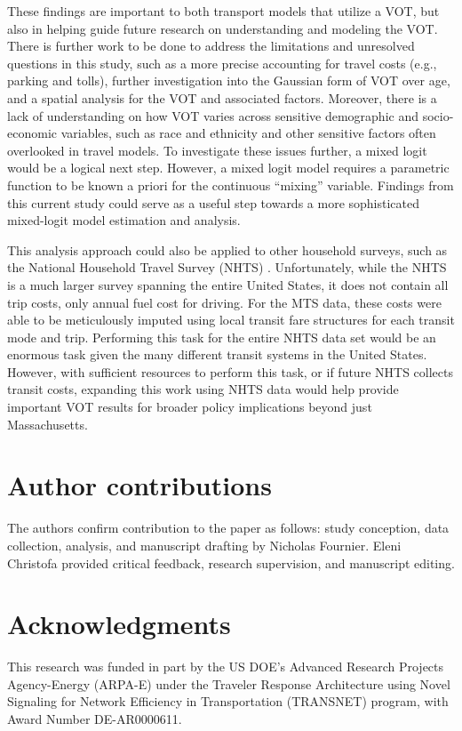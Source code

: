 \documentclass[numbered]{trbunofficial}\usepackage[]{graphicx}\usepackage[]{color}
\begin{document}
These findings are important to both transport models that utilize a VOT, but also in helping guide future research on understanding and modeling the VOT. There is further work to be done to address the limitations and unresolved questions in this study, such as a more precise accounting for travel costs (e.g., parking and tolls), further investigation into the Gaussian form of VOT over age, and a spatial analysis for the VOT and associated factors. Moreover, there is a lack of understanding on how VOT varies across sensitive demographic and socio-economic variables, such as race and ethnicity and other sensitive factors often overlooked in travel models. To investigate these issues further, a mixed logit would be a logical next step. However, a mixed logit model requires a parametric function to be known a priori for the continuous ``mixing'' variable. Findings from this current study could serve as a useful step towards a more sophisticated mixed-logit model estimation and analysis.

This analysis approach could also be applied to other household surveys, such as the National Household Travel Survey (NHTS) \citep{NHTS2017}. Unfortunately, while the NHTS is a much larger survey spanning the entire United States, it does not contain all trip costs, only annual fuel cost for driving. For the MTS data, these costs were able to be meticulously imputed using local transit fare structures for each transit mode and trip. Performing this task for the entire NHTS data set would be an enormous task given the many different transit systems in the United States. However, with sufficient resources to perform this task, or if future NHTS collects transit costs, expanding this work using NHTS data would help provide important VOT results for broader policy implications beyond just Massachusetts.


\section{Author contributions}
The authors confirm contribution to the paper as follows: study conception, data collection, analysis, and manuscript drafting by Nicholas Fournier. Eleni Christofa provided critical feedback, research supervision, and manuscript editing.

\section{Acknowledgments}
This research was funded in part by the US DOE's Advanced Research Projects Agency-Energy (ARPA-E) under the Traveler Response Architecture using Novel Signaling for Network Efficiency in Transportation (TRANSNET) program, with Award Number DE-AR0000611.





\pagebreak

\end{document}
